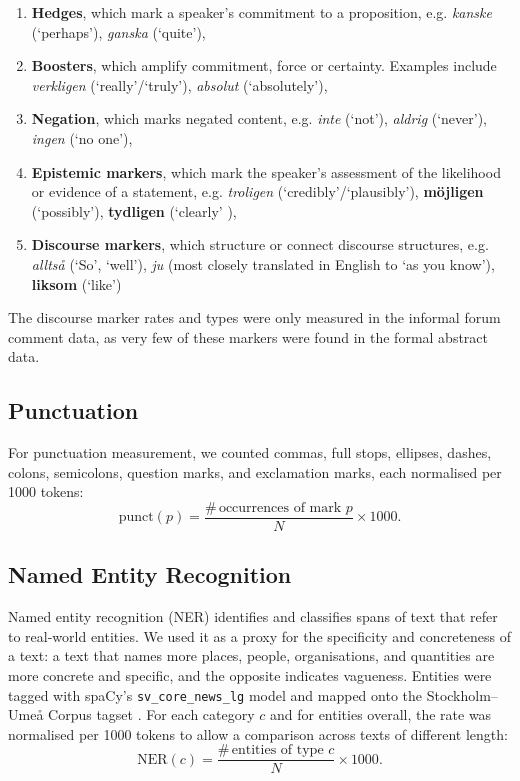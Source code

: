 \documentclass[thesis]{cluu}
\begin{document}
\begin{enumerate}
    \item \textbf{Hedges}, which mark a speaker's commitment to a proposition, e.g. \textit{kanske} (`perhaps'), \textit{ganska} (`quite'),
    \item \textbf{Boosters}, which amplify commitment, force or certainty. Examples include \textit{verkligen} (`really'/`truly'), \textit{absolut} (`absolutely'),
    \item \textbf{Negation}, which marks negated content, e.g. \textit{inte} (`not'), \textit{aldrig} (`never'), \textit{ingen} (`no one'),
    \item \textbf{Epistemic markers}, which mark the speaker's assessment of the likelihood or evidence of a statement, e.g. \textit{troligen} (`credibly'/`plausibly'), \textbf{möjligen} (`possibly'), \textbf{tydligen} (`clearly'
    ), 
    \item \textbf{Discourse markers}, which structure or connect discourse structures, e.g. \textit{alltså} (`So', `well'), \textit{ju} (most closely translated in English to `as you know'), \textbf{liksom} (`like')
\end{enumerate}

The discourse marker rates and types were only measured in the informal forum comment data, as very few of these markers were found in the formal abstract data. 

\subsection{Punctuation}
For punctuation measurement, we counted commas, full stops,
ellipses, dashes, colons, semicolons, question marks, and exclamation marks, each
normalised per 1000 tokens:
\begin{equation}
\mathrm{punct}(p) = \frac{\#\,\text{occurrences of mark } p}{N}\times 1000 .
\end{equation}

\subsection{Named Entity Recognition}
Named entity recognition (NER) identifies and classifies spans of text that refer
to real-world entities. We used it as a proxy for the specificity and concreteness
of a text: a text that names more places, people, organisations, and
quantities are more concrete and specific, and the opposite indicates vagueness. Entities were tagged with spaCy's
\texttt{sv\_core\_news\_lg} model and mapped onto the Stockholm--Ume\aa{} Corpus
tagset \parencite{suc3}. For each category $c$ and for entities overall,
the rate was normalised per 1000 tokens to allow a comparison across texts of
different length:
\begin{equation}
\mathrm{NER}(c) = \frac{\#\,\text{entities of type } c}{N}\times 1000 .
\end{equation}
\end{document}
